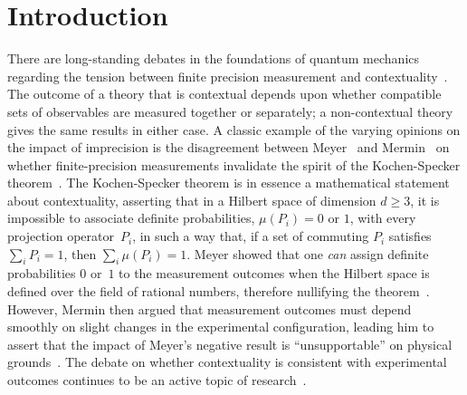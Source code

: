 \documentclass[english,reprint, aps, prl,superscriptaddress, showpacs,
showkeys, longbibliography, amsmath, amssymb, floatfix]{revtex4-1}
\theoremstyle{plain}
\theoremstyle{definition}
\begin{document}
\section{Introduction}

There are long-standing debates in the foundations of quantum
mechanics regarding the tension between finite precision measurement
and contextuality~\cite{BarrettKent2004,Appleby_2005}. The outcome of
a theory that is contextual depends upon whether compatible sets of
observables are measured together or separately; a non-contextual
theory gives the same results in either case.  A classic example of
the varying opinions on the impact of imprecision is the disagreement
between Meyer~\cite{PhysRevLett.83.3751} and Mermin~\cite{Mermin1999}
on whether finite-precision measurements invalidate the spirit of the
Kochen-Specker
theorem~\cite{kochenspecker1967,Redhead1987-REDINA,peres1995quantum,Jaeger2007,Held2016}.
The Kochen-Specker theorem is in essence a mathematical statement
about contextuality, asserting that in a Hilbert space of dimension
$d \ge 3$, it is impossible to associate definite probabilities,
$\mu(P_i)= 0$ or $1$, with every projection operator~$P_i$, in such a
way that, if a set of commuting $P_i$ satisfies $\sum_i P_i = 1$, then
$\sum_i \mu(P_i) = 1$.  Meyer showed that one {\it can\/} assign
definite probabilities $0$ or~$1$ to the measurement outcomes when the
Hilbert space is defined over the field of rational numbers, therefore
nullifying the theorem~\citep{PhysRevLett.83.3751}.  However, Mermin
then argued that measurement outcomes must depend smoothly on slight
changes in the experimental configuration, leading him to assert that
the impact of Meyer's negative result is
``unsupportable'' on physical grounds~\citep{Mermin1999}.  The debate on whether
contextuality is consistent with experimental outcomes continues to be
an active topic of
research~\citep{Kent1999,HavlicekKrennSummhammerSvozil2001,SimonBruknerZeilinger2001,Cabello2002,Larsson2002,Appleby2002,BarrettKent2004,Appleby_2005,Spekkens2005,GuehneKleinmannCabelloEtAl2010,MazurekPuseyKunjwalEtAl2016}.
\end{document}
